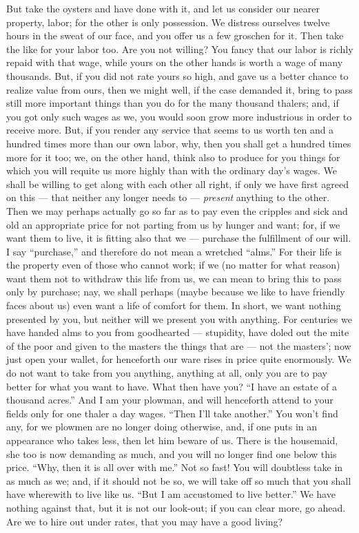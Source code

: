 But take the oysters and have done with it, and let us consider our nearer 
property, labor; for the other is only possession. We distress ourselves 
twelve hours in the sweat of our face, and you offer us a few groschen for it. 
Then take the like for your labor too. Are you not willing? You fancy that our 
labor is richly repaid with that wage, while yours on the other hands is worth 
a wage of many thousands. But, if you did not rate yours so high, and gave us 
a better chance to realize value from ours, then we might well, if the case 
demanded it, bring to pass still more important things than you do for the 
many thousand thalers; and, if you got only such wages as we, you would soon 
grow more industrious in order to receive more. But, if you render any service 
that seems to us worth ten and a hundred times more than our own labor, why, 
then you shall get a hundred times more for it too; we, on the other hand, 
think also to produce for you things for which you will requite us more highly 
than with the ordinary day's wages. We shall be willing to get along with each 
other all right, if only we have first agreed on this --- that neither any 
longer needs to --- \textit{present} anything to the other. Then we may perhaps 
actually go so far as to pay even the cripples and sick and old an appropriate 
price for not parting from us by hunger and want; for, if we want them to 
live, it is fitting also that we --- purchase the fulfillment of our will. I 
say ``purchase,'' and therefore do not mean a wretched ``alms.'' For their 
life is the property even of those who cannot work; if we (no matter for what 
reason) want them not to withdraw this life from us, we can mean to bring this 
to pass only by purchase; nay, we shall perhaps (maybe because we like to have 
friendly faces about us) even want a life of comfort for them. In short, we 
want nothing presented by you, but neither will we present you with anything. 
For centuries we have handed alms to you from goodhearted --- stupidity, have 
doled out the mite of the poor and given to the masters the things that are --- not the masters'; now just open your wallet, for henceforth our ware rises in 
price quite enormously. We do not want to take from you anything, anything at 
all, only you are to pay better for what you want to have. What then have you? 
``I have an estate of a thousand acres.'' And I am your plowman, and will 
henceforth attend to your fields only for one thaler a day wages. ``Then I'll 
take another.'' You won't find any, for we plowmen are no longer doing 
otherwise, and, if one puts in an appearance who takes less, then let him 
beware of us. There is the housemaid, she too is now demanding as much, and 
you will no longer find one below this price. ``Why, then it is all over with 
me.'' Not so fast! You will doubtless take in as much as we; and, if it 
should not be so, we will take off so much that you shall have wherewith to 
live like us. ``But I am accustomed to live better.'' We have nothing 
against that, but it is not our look-out; if you can clear more, go ahead. Are 
we to hire out under rates, that you may have a good living?

